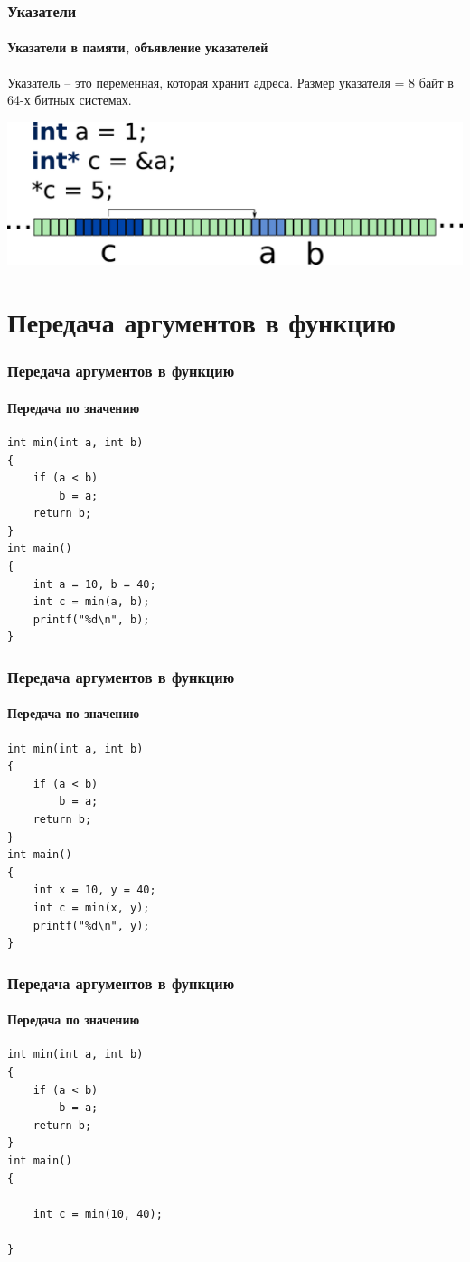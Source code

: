 \documentclass[12pt,pdf,hyperref={unicode}]{beamer}
\begin{document}
\begin{frame}[fragile]
\frametitle{Указатели} 
\framesubtitle{Указатели в памяти, объявление указателей}
Указатель -- это переменная, которая хранит адреса. 
Размер указателя = 8 байт в 64-х битных системах.
\begin{center}
\includegraphics[width=0.95\linewidth]{images/memory_pointer_4.png}
\end{center}
\end{frame}


\section{Передача аргументов в функцию}

\begin{frame}[fragile]
\frametitle{Передача аргументов в функцию}
\framesubtitle{Передача по значению}
\begin{lstlisting}
int min(int a, int b)
{
    if (a < b)
        b = a;
   	return b;
}
int main()
{
    int a = 10, b = 40;
    int c = min(a, b);
    printf("%d\n", b);
}
\end{lstlisting}
\end{frame}

\begin{frame}[fragile]
\frametitle{Передача аргументов в функцию}
\framesubtitle{Передача по значению}
\begin{lstlisting}
int min(int a, int b)
{
    if (a < b)
        b = a;
   	return b;
}
int main()
{
    int x = 10, y = 40;
    int c = min(x, y);
    printf("%d\n", y);
}
\end{lstlisting}
\end{frame}

\begin{frame}[fragile]
\frametitle{Передача аргументов в функцию}
\framesubtitle{Передача по значению}
\begin{lstlisting}
int min(int a, int b)
{
    if (a < b)
        b = a;
   	return b;
}
int main()
{

    int c = min(10, 40);

}
\end{lstlisting}
\end{frame}
\end{document}
